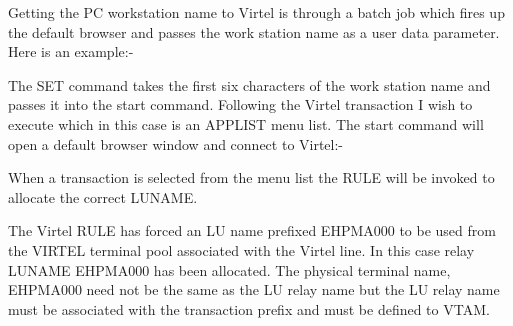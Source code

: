 \documentclass[letterpaper,10pt,english]{sphinxmanual}
\begin{document}
Getting the PC workstation name to Virtel is through a batch job which fires up the default browser and passes the work station name as a user
data parameter. Here is an example:-

\begin{sphinxVerbatim}[commandchars=\\\{\}]
     
 
 
 
  
\end{sphinxVerbatim}

The SET command takes the first six characters of the work station name and passes it into the start command. Following the Virtel transaction I wish to execute which in this case is an APPLIST menu list. The start command will open a default browser window and connect to Virtel:-



When a transaction is selected from the menu list the RULE will be invoked to allocate the correct LUNAME.



The Virtel RULE has forced an LU name prefixed EHPMA000 to be used from the VIRTEL terminal pool associated with the Virtel line. In this case relay LUNAME EHPMA000 has been allocated. The physical terminal name, EHPMA000 need not be the same as the LU relay name but the LU relay name must be associated with the transaction prefix and must be defined to VTAM.

\ignorespaces 
\end{document}
